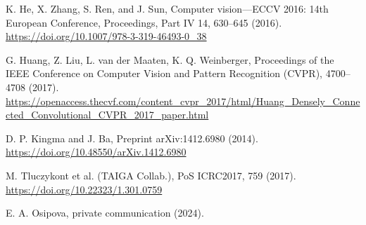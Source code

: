 \documentclass[reprint,
superscriptaddress,
amsmath,amssymb,aps,showkeys,showpacs,
twoside,final,secnumarabic,%
nofootinbib]{revtex4-2}
\begin{document}
\begin{thebibliography}{}

K. He, X. Zhang, S. Ren, and J. Sun,
Computer vision---ECCV 2016: 14th European Conference, Proceedings, Part IV 14, 630--645 (2016).
\url{https://doi.org/10.1007/978-3-319-46493-0_38}

G. Huang, Z. Liu, L. van der Maaten, K. Q. Weinberger,
Proceedings of the IEEE Conference on Computer Vision and Pattern Recognition (CVPR), 4700--4708 (2017).
\url{https://openaccess.thecvf.com/content_cvpr_2017/html/Huang_Densely_Connected_Convolutional_CVPR_2017_paper.html}

D. P. Kingma and J. Ba,
Preprint arXiv:1412.6980 (2014).
\url{https://doi.org/10.48550/arXiv.1412.6980}

M. Tluczykont et al. (TAIGA Collab.), 
PoS ICRC2017, 759 (2017).
\url{https://doi.org/10.22323/1.301.0759}

E. A. Osipova,
private communication (2024).


\end{thebibliography}
\end{document}
